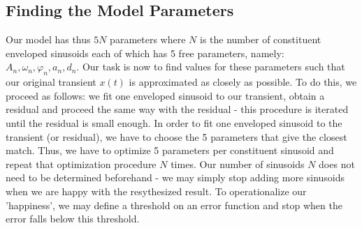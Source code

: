 \subsection{Finding the Model Parameters}
Our model has thus $5N$ parameters where $N$ is the number of constituent enveloped sinusoids each of which has 5 free parameters, namely: $A_n, \omega_n, \varphi_n, a_n, d_n$. Our task is now to find values for these parameters such that our original transient $x(t)$ is approximated as closely as possible. To do this, we proceed as follows: we fit one enveloped sinusoid to our transient, obtain a residual and proceed the same way with the residual - this procedure is iterated until the residual is small enough. In order to fit one enveloped sinusoid to the transient (or residual), we have to choose the 5 parameters that give the closest match. Thus, we have to optimize 5 parameters per constituent sinusoid and repeat that optimization procedure $N$ times. Our number of sinusoids $N$ does not need to be determined beforehand - we may simply stop adding more sinusoids when we are happy with the resythesized result. To operationalize our 'happiness', we may define a threshold on an error function and stop when the error falls below this threshold.













